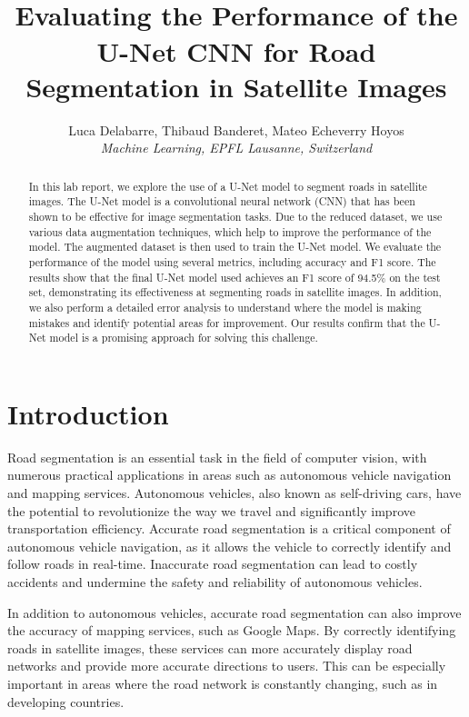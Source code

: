 \documentclass[10pt,conference,compsocconf]{IEEEtran}
\begin{document}
\title{\Large{\\
\textbf{Evaluating the Performance of the U-Net CNN for Road Segmentation in Satellite Images}}}


\author{Luca Delabarre, Thibaud Banderet, Mateo Echeverry Hoyos\\
\textit{Machine Learning, EPFL Lausanne, Switzerland}}


\maketitle

\begin{abstract}
In this lab report, we explore the use of a U-Net model to segment roads in satellite images. The U-Net model is a convolutional neural network (CNN) that has been shown to be effective for image segmentation tasks. Due to the reduced dataset, we use various data augmentation techniques, which help to improve the performance of the model. The augmented dataset is then used to train the U-Net model. We evaluate the performance of the model using several metrics, including accuracy and F1 score. The results show that the final U-Net model used achieves an F1 score of 94.5\% on the test set, demonstrating its effectiveness at segmenting roads in satellite images. In addition, we also perform a detailed error analysis to understand where the model is making mistakes and identify potential areas for improvement. Our results confirm that the U-Net model is a promising approach for solving this challenge.
\end{abstract}

\section{Introduction}
Road segmentation is an essential task in the field of computer vision, with numerous practical applications in areas such as autonomous vehicle navigation and mapping services. Autonomous vehicles, also known as self-driving cars, have the potential to revolutionize the way we travel and significantly improve transportation efficiency. Accurate road segmentation is a critical component of autonomous vehicle navigation, as it allows the vehicle to correctly identify and follow roads in real-time. Inaccurate road segmentation can lead to costly accidents and undermine the safety and reliability of autonomous vehicles.

In addition to autonomous vehicles, accurate road segmentation can also improve the accuracy of mapping services, such as Google Maps. By correctly identifying roads in satellite images, these services can more accurately display road networks and provide more accurate directions to users. This can be especially important in areas where the road network is constantly changing, such as in developing countries.
\end{document}
